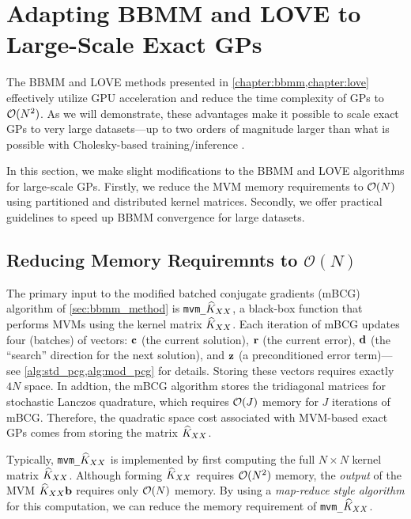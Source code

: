 \section{Adapting BBMM and LOVE to Large-Scale Exact GPs}
\label{sec:largeexact_method}

The BBMM and LOVE methods presented in \cref{chapter:bbmm,chapter:love} effectively utilize GPU acceleration and reduce the time complexity of GPs to $\bigo{N^2}$.
As we will demonstrate, these advantages make it possible to scale exact GPs to very large datasets---up to two orders of magnitude larger than what is possible with Cholesky-based training/inference \cite{nguyen2019exact}.

In this section, we make slight modifications to the BBMM and LOVE algorithms for large-scale GPs.
Firstly, we reduce the MVM memory requirements to $\bigo{N}$ using partitioned and distributed kernel matrices.
Secondly, we offer practical guidelines to speed up BBMM convergence for large datasets.




\subsection{Reducing Memory Requiremnts to $\mathcal{O}(N)$}

The primary input to the modified batched conjugate gradients (mBCG) algorithm of \cref{sec:bbmm_method} is {\tt mvm\_$\widehat{K}_{XX}$}, a black-box function that performs MVMs using the kernel matrix $\widehat{K}_{XX}$.
Each iteration of mBCG updates four (batches) of vectors: $\mathbf{c}$ (the current solution), $\mathbf{r}$ (the current error), $\mathbf{d}$ (the ``search'' direction for the next solution), and $\mathbf{z}$ (a preconditioned error term)---see \cref{alg:std_pcg,alg:mod_pcg} for details.
Storing these vectors requires exactly $4N$ space.
In addtion, the mBCG algorithm stores the tridiagonal matrices for stochastic Lanczos quadrature, which requires $\bigo{J}$ memory for $J$ iterations of mBCG.
Therefore, the quadratic space cost associated with MVM-based exact GPs comes from storing the matrix $\widehat{K}_{XX}$.

Typically, {\tt mvm\_$\widehat{K}_{XX}$} is implemented by first computing the full $N \times N$ kernel matrix $\widehat{K}_{XX}$.
Although forming $\widehat{K}_{XX}$ requires $\bigo{N^2}$ memory, the \emph{output} of the MVM $\widehat{K}_{XX} \mathbf{b}$ requires only $\bigo{N}$ memory.
By using a \emph{map-reduce style algorithm} for this computation, we can reduce the memory requirement of {\tt mvm\_$\widehat{K}_{XX}$}.

